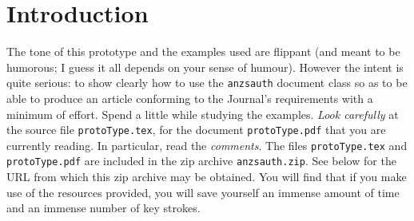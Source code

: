 \documentclass[times, doublespace]{anzsauth}
\begin{document}


\maketitle
\section{Introduction}
\label{sec:intro}
The tone of this prototype and the examples used are flippant
(and meant to be humorous; I guess it all depends on your sense
of humour).  However the intent is quite serious:  to show clearly
how to use the \texttt{anzsauth} document class so as to be able to
produce an article conforming to the Journal's requirements with
a minimum of effort.  Spend a little while studying the examples.
\emph{Look carefully} at the source file \texttt{protoType.tex},
for the document \texttt{protoType.pdf} that you are currently
reading.  In particular, read the \emph{comments}.  The files
\texttt{protoType.tex} and \texttt{protoType.pdf} are included
in the zip archive \texttt{anzsauth.zip}.  See below for the URL
from which this zip archive may be obtained.  You will find that
if you make use of the resources provided, you will save yourself
an immense amount of time and an immense number of key strokes.
\end{document}
